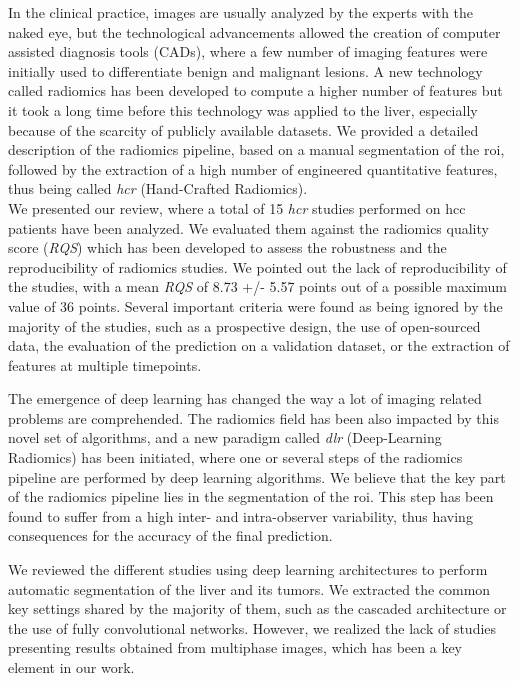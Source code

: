 In the clinical practice, images are usually analyzed by the experts
with the naked eye, but the technological advancements allowed the
creation of computer assisted diagnosis tools (CADs), where a few number
of imaging features were initially used to differentiate benign and
malignant lesions.
A new technology called radiomics has been developed to compute a higher
number of features but it took a long time before this technology was
applied to the liver, especially because of the scarcity of publicly
available datasets. We provided a detailed description of the radiomics pipeline,  based on a manual segmentation of the \ac{roi}, followed by the extraction of a high number of engineered quantitative features, thus being called \emph{\ac{hcr}} (Hand-Crafted Radiomics).\\
We presented our review, where a total of 15 \emph{\ac{hcr}} studies
performed on \ac{hcc} patients have been analyzed.
We evaluated them against the radiomics quality score (\emph{RQS})
which has been developed to assess the robustness and the
reproducibility of radiomics studies.
We pointed out the lack of reproducibility of the studies, with a mean
\emph{RQS} of 8.73 +/- 5.57 points out of a possible maximum value of 36
points. Several important criteria were found as being ignored by the majority of the studies, such as a prospective design, the use of open-sourced data, the evaluation of the prediction on a validation dataset, or the extraction of features at multiple timepoints.

The emergence of deep learning has changed the way a lot of imaging
related problems are comprehended.
The radiomics field has been also impacted by this novel set of
algorithms, and a new paradigm called \emph{\ac{dlr}} (Deep-Learning
Radiomics) has been initiated, where one or several steps of the
radiomics pipeline are performed by deep learning algorithms.
We believe that the key part of the radiomics pipeline lies in the
segmentation of the \ac{roi}. This step has been found to suffer from a high inter- and intra-observer variability, thus having consequences for the accuracy of the final prediction. 

We reviewed the different studies using deep learning architectures to
perform automatic segmentation of the liver and its tumors. We extracted
the common key settings shared by the majority of them, such as the
cascaded architecture or the use of fully convolutional networks.
However, we realized the lack of studies presenting results obtained
from multiphase images, which has been a key element in our work. 


